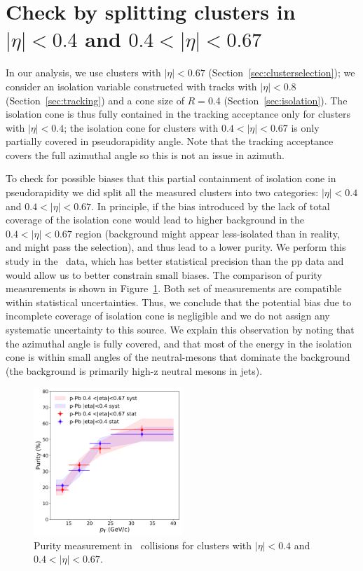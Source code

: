 \section{Check by splitting clusters in $|\eta|<0.4$ and $0.4<|\eta|<0.67$ }

In our analysis, we use clusters with $|\eta|<0.67$ (Section~\ref{sec:clusterselection}); we consider an isolation variable constructed with tracks with $|\eta|<0.8$ (Section~\ref{sec:tracking}) and a cone size of $R=$0.4 (Section~\ref{sec:isolation}). The isolation cone is thus fully contained in the tracking acceptance only for clusters with $|\eta|<0.4$; the isolation cone for clusters with $0.4<|\eta|<0.67$ is only partially covered in pseudorapidity angle. 
Note that the tracking acceptance covers the full azimuthal angle so this is not an issue in azimuth. 

To check for possible biases that this partial containment of isolation cone in pseudorapidity we did split all the measured clusters into two categories: $|\eta|<0.4$ and $0.4<|\eta|<0.67$. In principle, if the bias introduced by the lack of total coverage of the isolation cone would lead to higher background in the $0.4<|\eta|<0.67$ region (background might appear less-isolated than in reality, and might pass the selection), and thus lead to a lower purity. We perform this study in the \pPb~data, which has better statistical precision than the pp data and would allow us to better constrain small biases. The comparison of purity measurements is shown in Figure~\ref{fig:spliteta}. Both set of measurements are compatible within statistical uncertainties. Thus, we conclude that the potential bias due to incomplete coverage of isolation cone is negligible and we do not assign any systematic uncertainty to this source. We explain this observation by noting that the azimuthal angle is fully covered, and that most of the energy in the isolation cone is within small angles of the neutral-mesons that 
dominate the background (the background is primarily high-z neutral mesons in jets). 

\begin{figure}
	\center
	\includegraphics[width=0.5\textwidth]{SplitEtaStudy.png}
	\caption{Purity measurement in \pPb~collisions for clusters with $|\eta|<0.4$ and $0.4<|\eta|<0.67$.}
	\label{fig:spliteta}
\end{figure}

